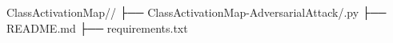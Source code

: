 ClassActivationMap//
├── ClassActivationMap-AdversarialAttack/.py
├── README.md
├── requirements.txt
